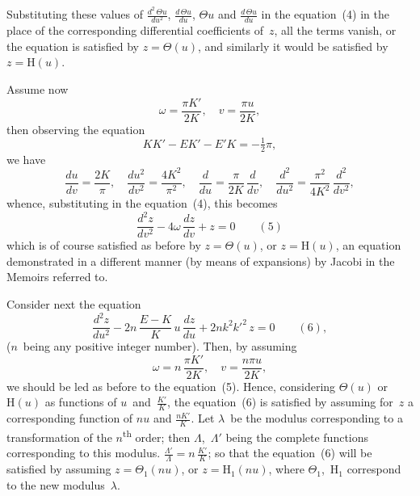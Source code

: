\documentclass[11pt,a4paper]{article}
\begin{document}
\newpage
Substituting these values of $\frac{d^2\,\Theta u}{du^2}$, $\frac{d\,\Theta u}{du}$, $\Theta u$ and $\frac{d\,\Theta u}{du}$ in the equation~(4) in the place of the corresponding differential coefficients of~$z$, all the terms vanish, or the equation is satisfied by $z = \Theta(u)$, and similarly it would be satisfied by $z = \mathrm{H}(u)$.

Assume now
\[
\omega = \frac{\pi K'}{2K}, \quad v = \frac{\pi u}{2K},
\]
then observing the equation
\[
KK' - EK' - E'K = -\tfrac{1}{2}\pi,
\]
we have
\[
\frac{du}{dv} = \frac{2K}{\pi}, \quad \frac{du^2}{dv^2} = \frac{4K^2}{\pi^2}, \quad \frac{d}{du} = \frac{\pi}{2K}\,\frac{d}{dv}, \quad \frac{d^2}{du^2} = \frac{\pi^2}{4K^2}\,\frac{d^2}{dv^2},
\]
whence, substituting in the equation~(4), this becomes
\[
\frac{d^2z}{dv^2} - 4\omega\,\frac{dz}{dv} + z = 0 \qquad(5)
\]
which is of course satisfied as before by $z = \Theta(u)$, or $z = \mathrm{H}(u)$, an equation demonstrated in a different manner (by means of expansions) by Jacobi in the Memoirs referred to.

Consider next the equation
\[
\frac{d^2z}{du^2} - 2n\,\frac{E-K}{K}\,u\,\frac{dz}{du} + 2nk^2k'^2\,z = 0 \qquad(6),
\]
($n$~being any positive integer number). Then, by assuming
\[
\omega = n\,\frac{\pi K'}{2K}, \quad v = \frac{n\pi u}{2K},
\]
we should be led as before to the equation~(5). Hence, considering $\Theta(u)$ or $\mathrm{H}(u)$ as functions of $u$~and~$\frac{K'}{K}$, the equation~(6) is satisfied by assuming for~$z$ a corresponding function of $nu$ and $\frac{nK'}{K}$. Let $\lambda$~be the modulus corresponding to a transformation of the $n$\textsuperscript{th} order; then $\Lambda$,~$\Lambda'$ being the complete functions corresponding to this modulus. $\frac{\Lambda'}{\Lambda} = n\,\frac{K'}{K}$; so that the equation~(6) will be satisfied by assuming $z = \Theta_1(nu)$, or $z = \mathrm{H}_1(nu)$, where $\Theta_1$,~$\mathrm{H}_1$ correspond to the new modulus~$\lambda$.
\end{document}
